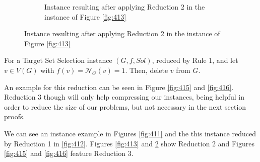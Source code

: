 \begin{figure}[!ht]
\begin{subfigure}[t]{0.5\textwidth}
        \caption{Instance resulting after applying Reduction 2 in the instance of Figure \ref{fig:413}}
        \label{fig:414}
    \end{subfigure}
\end{figure}

\begin{myred}
    For a Target Set Selection instance $(G, f, Sol)$, reduced by Rule 1, and let  $v \in V (G)$ with $f(v) = \mathcal{N}_{G}(v) = 1$. Then, delete $v$ from $G$.
    \end{myred}
    An example for this reduction can be seen in Figure \ref{fig:415} and \ref{fig:416}.
Reduction 3 though will only help compressing our instances, being helpful in order to reduce the size of our problems, but not necessary in the next section proofs.


We can see an instance example in Figures \ref{fig:411} and the this instance reduced by Reduction 1 in \ref{fig:412}. Figures 
\ref{fig:413} and \ref{fig:414} show Reduction 2 and Figures \ref{fig:415} and \ref{fig:416} feature Reduction 3.

